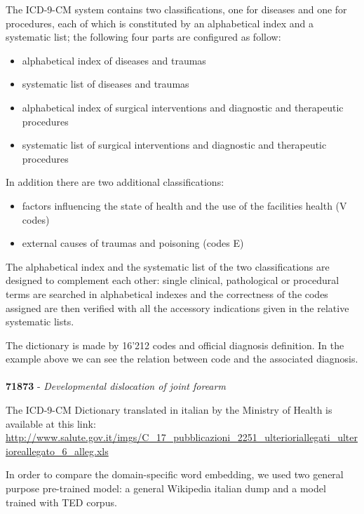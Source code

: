 The ICD-9-CM system contains two classifications, one for diseases and one for procedures, each of which is constituted by an alphabetical index and a systematic list; the following four parts are configured as follow:
\begin{itemize}
	\item alphabetical index of diseases and traumas
	\item systematic list of diseases and traumas
	\item alphabetical index of surgical interventions and diagnostic and therapeutic procedures
	\item systematic list of surgical interventions and diagnostic and therapeutic procedures
\end{itemize}
In addition there are two additional classifications:
\begin{itemize}
	\item factors influencing the state of health and the use of the facilities health (V codes)
	\item external causes of traumas and poisoning (codes E)
\end{itemize}
The alphabetical index and the systematic list of the two classifications are designed to complement each other: single clinical, pathological or procedural terms are searched in alphabetical indexes and the correctness of the codes assigned are then verified with all the accessory indications given in the relative systematic lists.



The dictionary is made by 16'212 codes and official diagnosis definition. In the example above %
we can see the relation between code and the associated diagnosis.
\\\\
\indent \textbf{71873} - \textit{Developmental dislocation of joint forearm}

The ICD-9-CM Dictionary translated in italian by the Ministry of Health is available at this link: \url{http://www.salute.gov.it/imgs/C\_17\_pubblicazioni\_2251\_ulterioriallegati\_ulterioreallegato\_6\_alleg.xls}



In order to compare the domain-specific word embedding, we used two general purpose pre-trained model: a general Wikipedia italian dump and a model trained with TED corpus.


